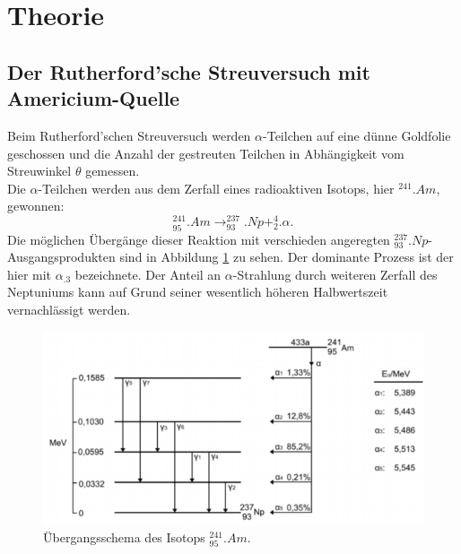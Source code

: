 \section{Theorie}
\label{sec:Theorie}

\subsection{Der Rutherford'sche Streuversuch mit Americium-Quelle}
Beim Rutherford'schen Streuversuch werden $\alpha$-Teilchen auf eine dünne Goldfolie geschossen und die Anzahl der gestreuten Teilchen in Abhängigkeit vom Streuwinkel $\theta$ gemessen.\\
Die $\alpha$-Teilchen werden aus dem Zerfall eines radioaktiven Isotops, hier $^{241}.{Am}$, gewonnen:
\[
^{241}_{95}.{Am}\rightarrow ^{237}_{93}.{Np} + ^{4}_{2}.{\alpha}\text{.}
\]
Die möglichen Übergänge dieser Reaktion mit verschieden angeregten $^{237}_{93}.{Np}$-Ausgangsprodukten sind in Abbildung \ref{fig:uebergang} zu sehen. Der dominante Prozess ist der hier mit $\alpha_.3$ bezeichnete. Der Anteil an $\alpha$-Strahlung durch weiteren Zerfall des Neptuniums kann auf Grund seiner wesentlich höheren Halbwertszeit vernachlässigt werden.\\
\begin{figure}
\centering
\includegraphics[width=\linewidth-60pt,keepaspectratio]{content/images/uebergang.pdf}
\caption{Übergangsschema des Isotops $^{241}_{95}.{Am}$.\cite{uebergang16}}
\label{fig:uebergang}
\end{figure}
